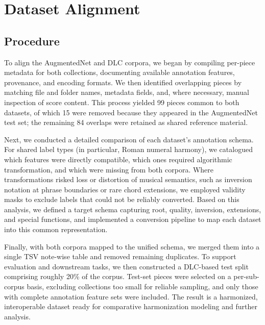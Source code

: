 \documentclass[sigconf]{acmart} %
\begin{document}


\section{Dataset Alignment}

\subsection{Procedure}\label{subsec:procedure}

To align the AugmentedNet and DLC corpora, we began by compiling per-piece metadata for both collections, documenting available annotation features, provenance, and encoding formats.  We then identified overlapping pieces by matching file and folder names, metadata fields, and, where necessary, manual inspection of score content. This process yielded 99 pieces common to both datasets, of which 15 were removed because they appeared in the AugmentedNet test set; the remaining 84 overlaps were retained as shared reference material.

Next, we conducted a detailed comparison of each dataset’s annotation schema. For shared label types (in particular, Roman numeral harmony), we catalogued which features were directly compatible, which ones required algorithmic transformation, and which were missing from both corpora. Where transformations risked loss or distortion of musical semantics, such as inversion notation at phrase boundaries or rare chord extensions, we employed validity masks to exclude labels that could not be reliably converted. Based on this analysis, we defined a target schema capturing root, quality, inversion, extensions, and special functions, and implemented a conversion pipeline to map each dataset into this common representation.

Finally, with both corpora mapped to the unified schema, we merged them into a single TSV note-wise table and removed remaining duplicates. To support evaluation and downstream tasks, we then constructed a DLC-based test split comprising roughly 20\% of the corpus.  Test-set pieces were selected on a per-sub-corpus basis, excluding collections too small for reliable sampling, and only those with complete annotation feature sets were included. The result is a harmonized, interoperable dataset ready for comparative harmonization modeling and further analysis. 
\end{document}
